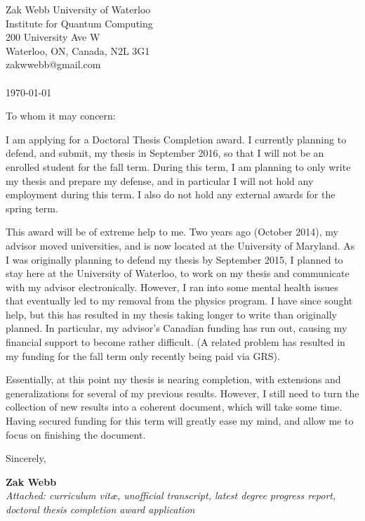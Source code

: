 \documentclass[11pt,a4paper]{article}
\begin{document}
\begin{flushright}
Zak Webb
\hfill
University of Waterloo\\
Institute for Quantum Computing\\
200 University Ave W\\
Waterloo, ON, Canada, N2L 3G1\\
 zakwwebb@gmail.com\\
~
\\
\today
\end{flushright}

To whom it may concern:

I am applying for a Doctoral Thesis Completion award.  I currently planning to defend, and submit, my thesis in September 2016, so that I will not be an enrolled student for the fall term.  During this term, I am planning to only write my thesis and prepare my defense, and in particular I will not hold any employment during this term.  I also do not hold any external awards for the spring term.

This award will be of extreme help to me.  Two years ago (October 2014), my advisor moved universities, and is now located at the University of Maryland.  As I was originally planning to defend my thesis by September 2015, I planned to stay here at the University of Waterloo, to work on my thesis and communicate with my advisor electronically.  However, I ran into some mental health issues that eventually led to my removal from the physics program.  I have since sought help, but this has resulted in my thesis taking longer to write than originally planned.  In particular, my advisor's Canadian funding has run out, causing my financial support to become rather difficult.  (A related problem has resulted in my funding for the fall term only recently being paid via GRS). 

Essentially, at this point my thesis is nearing completion, with extensions and generalizations for several of my previous results.  However, I still need to turn the collection of new results into a coherent document, which will take some time.   Having secured funding for this term will greatly ease my mind, and allow me to focus on finishing the document.



Sincerely,

\vspace{1in}

{\bfseries Zak Webb}\\
%
\vfill%
{\slshape Attached: curriculum vit\ae{}, unofficial transcript, latest degree progress report, doctoral thesis completion award application}
\end{document}
